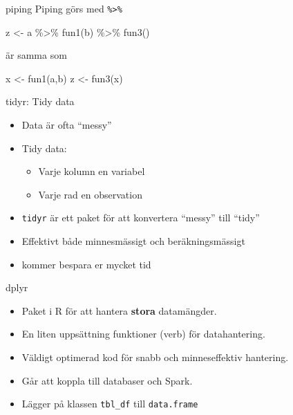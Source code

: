\documentclass[
  11pt,
  ignorenonframetext,
  handout]{beamer}
\newenvironment{Shaded}{\begin{snugshade}}{\end{snugshade}}
\newcommand{\FunctionTok}[1]{\textcolor[rgb]{0.00,0.00,0.00}{#1}}
\newcommand{\NormalTok}[1]{#1}
\newcommand{\OtherTok}[1]{\textcolor[rgb]{0.56,0.35,0.01}{#1}}
\newcommand{\SpecialCharTok}[1]{\textcolor[rgb]{0.00,0.00,0.00}{#1}}
\providecommand{\tightlist}{%
  \setlength{\itemsep}{0pt}\setlength{\parskip}{0pt}}
\begin{document}
\begin{frame}[fragile]{piping}
\protect\hypertarget{piping}{}
Piping görs med \texttt{\%\textgreater{}\%}

\begin{Shaded}
\begin{Highlighting}[]
\NormalTok{z }\OtherTok{\textless{}{-}}\NormalTok{ a }\SpecialCharTok{\%\textgreater{}\%}
  \FunctionTok{fun1}\NormalTok{(b) }\SpecialCharTok{\%\textgreater{}\%}
  \FunctionTok{fun3}\NormalTok{()}
\end{Highlighting}
\end{Shaded}

är samma som

\begin{Shaded}
\begin{Highlighting}[]
\NormalTok{x }\OtherTok{\textless{}{-}} \FunctionTok{fun1}\NormalTok{(a,b)}
\NormalTok{z }\OtherTok{\textless{}{-}} \FunctionTok{fun3}\NormalTok{(x)}
\end{Highlighting}
\end{Shaded}
\end{frame}

\begin{frame}[fragile]{tidyr: Tidy data}
\protect\hypertarget{tidyr-tidy-data}{}
\begin{itemize}
\tightlist
\item
  Data är ofta ``messy''
\item
  Tidy data:

  \begin{itemize}
  \tightlist
  \item
    Varje kolumn en variabel
  \item
    Varje rad en observation
  \end{itemize}
\item
  \texttt{tidyr} är ett paket för att konvertera ``messy'' till ``tidy''
\item
  Effektivt både minnesmässigt och beräkningsmässigt
\item
  kommer bespara er mycket tid
\end{itemize}
\end{frame}

\begin{frame}[fragile]{dplyr}
\protect\hypertarget{dplyr}{}
\begin{itemize}
\tightlist
\item
  Paket i R för att hantera \textbf{stora} datamängder.
\item
  En liten uppsättning funktioner (verb) för datahantering.
\item
  Väldigt optimerad kod för snabb och minneseffektiv hantering.
\item
  Går att koppla till databaser och Spark.
\item
  Lägger på klassen \texttt{tbl\_df} till \texttt{data.frame}
\end{itemize}
\end{frame}
\end{document}
